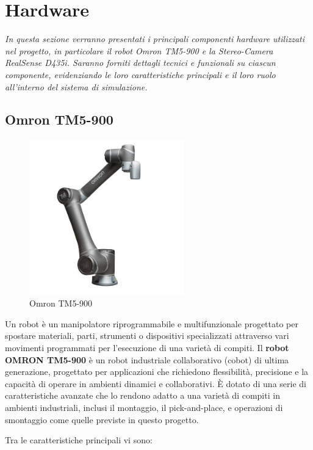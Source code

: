 \documentclass[11pt]{report}
\begin{document}
\section{Hardware}
\textit{In questa sezione verranno presentati i principali componenti hardware utilizzati nel progetto, in particolare il robot Omron TM5-900 e la Stereo-Camera RealSense D435i. Saranno forniti dettagli tecnici e funzionali su ciascun componente, evidenziando le loro caratteristiche principali e il loro ruolo all'interno del sistema di simulazione.}

\subsection{Omron TM5-900}
\begin{figure}[h!]
    \centering
    \includegraphics[width=0.6\textwidth]{images/omron.png}
    \caption{Omron TM5-900}
    \label{fig:omron}
\end{figure}

Un robot è un manipolatore riprogrammabile e multifunzionale progettato per spostare materiali, parti, strumenti o dispositivi specializzati attraverso vari movimenti programmati per l'esecuzione di una varietà di compiti. Il \textbf{robot OMRON TM5-900} è un robot industriale collaborativo (cobot) di ultima generazione, progettato per applicazioni che richiedono flessibilità, precisione e la capacità di operare in ambienti dinamici e collaborativi. È dotato di una serie di caratteristiche avanzate che lo rendono adatto a una varietà di compiti in ambienti industriali, inclusi il montaggio, il pick-and-place, e operazioni di smontaggio come quelle previste in questo progetto.

Tra le caratteristiche principali vi sono:
\end{document}

